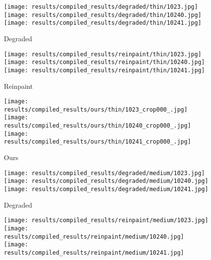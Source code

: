 \begin{figure*}[t!]
    \centering
    \begin{subfigure}[t]{0.10\linewidth}
      \captionsetup{justification=centering, labelformat=empty, font=scriptsize}
      \texttt{[image: results/compiled\_results/degraded/thin/1023.jpg]}
      \texttt{[image: results/compiled\_results/degraded/thin/10240.jpg]}
      \texttt{[image: results/compiled\_results/degraded/thin/10241.jpg]}
      \caption{Degraded}
    \end{subfigure}
    \begin{subfigure}[t]{0.10\linewidth}
      \captionsetup{justification=centering, labelformat=empty, font=scriptsize}
      \texttt{[image: results/compiled\_results/reinpaint/thin/1023.jpg]}
      \texttt{[image: results/compiled\_results/reinpaint/thin/10240.jpg]}
      \texttt{[image: results/compiled\_results/reinpaint/thin/10241.jpg]}
      \caption{Reinpaint}
    \end{subfigure}
    \begin{subfigure}[t]{0.10\linewidth}
      \captionsetup{justification=centering, labelformat=empty, font=scriptsize}
      \texttt{[image: results/compiled\_results/ours/thin/1023\_crop000\_.jpg]}
      \texttt{[image: results/compiled\_results/ours/thin/10240\_crop000\_.jpg]}
      \texttt{[image: results/compiled\_results/ours/thin/10241\_crop000\_.jpg]}
      \caption{Ours}
    \end{subfigure}
    \hspace{2mm}
    \begin{subfigure}[t]{0.10\linewidth}
      \captionsetup{justification=centering, labelformat=empty, font=scriptsize}
      \texttt{[image: results/compiled\_results/degraded/medium/1023.jpg]}
      \texttt{[image: results/compiled\_results/degraded/medium/10240.jpg]}
      \texttt{[image: results/compiled\_results/degraded/medium/10241.jpg]}
      \caption{Degraded}
    \end{subfigure}
    \begin{subfigure}[t]{0.10\linewidth}
      \captionsetup{justification=centering, labelformat=empty, font=scriptsize}
      \texttt{[image: results/compiled\_results/reinpaint/medium/1023.jpg]}
      \texttt{[image: results/compiled\_results/reinpaint/medium/10240.jpg]}
      \texttt{[image: results/compiled\_results/reinpaint/medium/10241.jpg]}

\end{subfigure}
\end{figure*}
